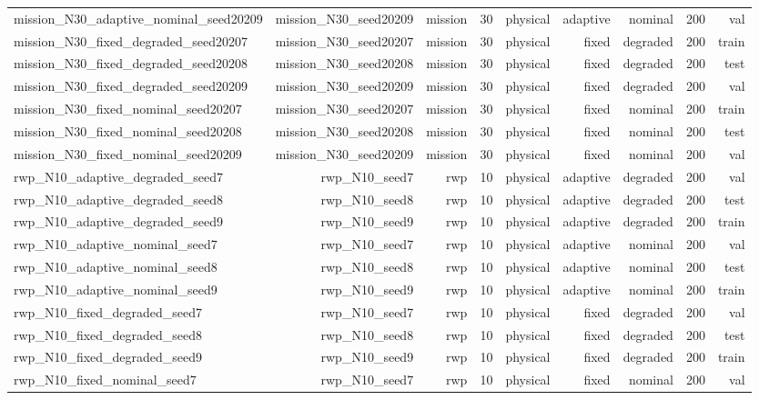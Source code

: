 \begin{tabular}{lrrrrrrrr}
mission\_N30\_adaptive\_nominal\_seed20209 & mission\_N30\_seed20209 & mission & 30 & physical & adaptive & nominal & 200 & val \\
mission\_N30\_fixed\_degraded\_seed20207 & mission\_N30\_seed20207 & mission & 30 & physical & fixed & degraded & 200 & train \\
mission\_N30\_fixed\_degraded\_seed20208 & mission\_N30\_seed20208 & mission & 30 & physical & fixed & degraded & 200 & test \\
mission\_N30\_fixed\_degraded\_seed20209 & mission\_N30\_seed20209 & mission & 30 & physical & fixed & degraded & 200 & val \\
mission\_N30\_fixed\_nominal\_seed20207 & mission\_N30\_seed20207 & mission & 30 & physical & fixed & nominal & 200 & train \\
mission\_N30\_fixed\_nominal\_seed20208 & mission\_N30\_seed20208 & mission & 30 & physical & fixed & nominal & 200 & test \\
mission\_N30\_fixed\_nominal\_seed20209 & mission\_N30\_seed20209 & mission & 30 & physical & fixed & nominal & 200 & val \\
rwp\_N10\_adaptive\_degraded\_seed7 & rwp\_N10\_seed7 & rwp & 10 & physical & adaptive & degraded & 200 & val \\
rwp\_N10\_adaptive\_degraded\_seed8 & rwp\_N10\_seed8 & rwp & 10 & physical & adaptive & degraded & 200 & test \\
rwp\_N10\_adaptive\_degraded\_seed9 & rwp\_N10\_seed9 & rwp & 10 & physical & adaptive & degraded & 200 & train \\
rwp\_N10\_adaptive\_nominal\_seed7 & rwp\_N10\_seed7 & rwp & 10 & physical & adaptive & nominal & 200 & val \\
rwp\_N10\_adaptive\_nominal\_seed8 & rwp\_N10\_seed8 & rwp & 10 & physical & adaptive & nominal & 200 & test \\
rwp\_N10\_adaptive\_nominal\_seed9 & rwp\_N10\_seed9 & rwp & 10 & physical & adaptive & nominal & 200 & train \\
rwp\_N10\_fixed\_degraded\_seed7 & rwp\_N10\_seed7 & rwp & 10 & physical & fixed & degraded & 200 & val \\
rwp\_N10\_fixed\_degraded\_seed8 & rwp\_N10\_seed8 & rwp & 10 & physical & fixed & degraded & 200 & test \\
rwp\_N10\_fixed\_degraded\_seed9 & rwp\_N10\_seed9 & rwp & 10 & physical & fixed & degraded & 200 & train \\
rwp\_N10\_fixed\_nominal\_seed7 & rwp\_N10\_seed7 & rwp & 10 & physical & fixed & nominal & 200 & val \\

\end{tabular}

